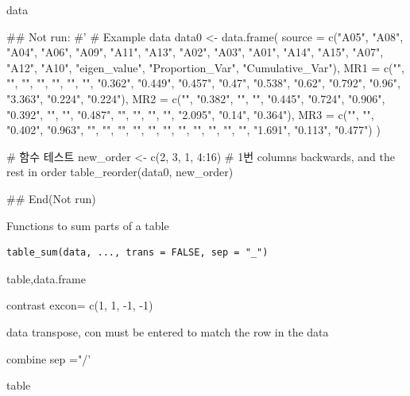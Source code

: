 \documentclass[a4paper]{book}
\begin{document}
%
\begin{Value}
data
\end{Value}
%
\begin{Examples}
\begin{ExampleCode}

## Not run: 
#'
# Example data
data0 <- data.frame(
  source = c("A05", "A08", "A04", "A06",
  "A09", "A11", "A13", "A02", "A03", "A01",
  "A14", "A15", "A07", "A12", "A10",
  "eigen_value", "Proportion_Var", "Cumulative_Var"),
  MR1 = c("", "", "", "", "", "", "", "0.362",
  "0.449", "0.457", "0.47", "0.538", "0.62",
  "0.792", "0.96", "3.363", "0.224", "0.224"),
  MR2 = c("", "0.382", "", "", "0.445", "0.724",
  "0.906", "0.392", "", "", "0.487", "", "", "",
   "", "2.095", "0.14", "0.364"),
  MR3 = c("", "", "0.402", "0.963", "", "", "",
  "", "", "", "", "", "", "", "", "1.691",
  "0.113", "0.477")
)

# 함수 테스트
new_order <- c(2, 3, 1, 4:16)
# 1번 columns backwards, and the rest in order
table_reorder(data0, new_order)

## End(Not run)

\end{ExampleCode}
\end{Examples}
%
\begin{Description}
Functions to sum parts of a table
\end{Description}
%
\begin{Usage}
\begin{verbatim}
table_sum(data, ..., trans = FALSE, sep = "_")
\end{verbatim}
\end{Usage}
%
\begin{Arguments}
\begin{ldescription}
\item[\code{data}] table,data.frame

\item[\code{...}] contrast excon= c(1, 1, -1, -1)

\item[\code{trans}] data transpose, con must be entered to match the row in the data

\item[\code{sep}] combine sep ="/'
\end{ldescription}
\end{Arguments}
%
\begin{Value}
table
\end{Value}
\end{document}
